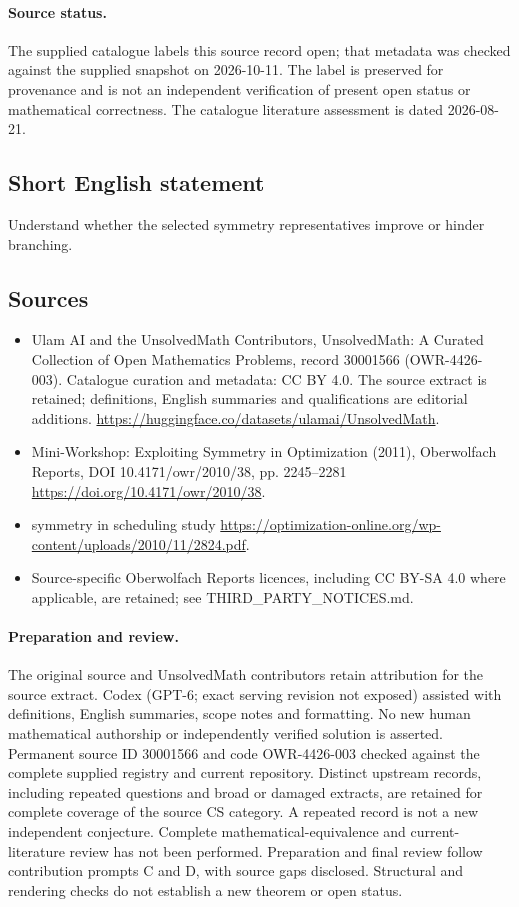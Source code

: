 \documentclass[11pt]{article}
\begin{document}
\paragraph{Source status.}
The supplied catalogue labels this source record open; that metadata was checked against the supplied snapshot on 2026-10-11. The label is preserved for provenance and is not an independent verification of present open status or mathematical correctness. The catalogue literature assessment is dated 2026-08-21.
\subsection{Short English statement}
Understand whether the selected symmetry representatives improve or hinder branching.
\subsection{Sources}
\begin{itemize}
\item[S1] Ulam AI and the UnsolvedMath Contributors, UnsolvedMath: A Curated Collection of Open Mathematics Problems, record 30001566 (OWR-4426-003). Catalogue curation and metadata: CC BY 4.0. The source extract is retained; definitions, English summaries and qualifications are editorial additions.
\url{https://huggingface.co/datasets/ulamai/UnsolvedMath}.
\item[S2] Mini-Workshop: Exploiting Symmetry in Optimization (2011), Oberwolfach Reports, DOI 10.4171/owr/2010/38, pp. 2245--2281
\url{https://doi.org/10.4171/owr/2010/38}.
\item[S3] symmetry in scheduling study
\url{https://optimization-online.org/wp-content/uploads/2010/11/2824.pdf}.
\item Source-specific Oberwolfach Reports licences, including CC BY-SA 4.0 where applicable, are retained; see THIRD\_PARTY\_NOTICES.md.
\end{itemize}
\paragraph{Preparation and review.}
The original source and UnsolvedMath contributors retain attribution for the source extract. Codex (GPT-6; exact serving revision not exposed) assisted with definitions, English summaries, scope notes and formatting. No new human mathematical authorship or independently verified solution is asserted. Permanent source ID 30001566 and code OWR-4426-003 checked against the complete supplied registry and current repository. Distinct upstream records, including repeated questions and broad or damaged extracts, are retained for complete coverage of the source CS category. A repeated record is not a new independent conjecture. Complete mathematical-equivalence and current-literature review has not been performed. Preparation and final review follow contribution prompts C and D, with source gaps disclosed. Structural and rendering checks do not establish a new theorem or open status.
\label{end:30001566}
\end{document}
